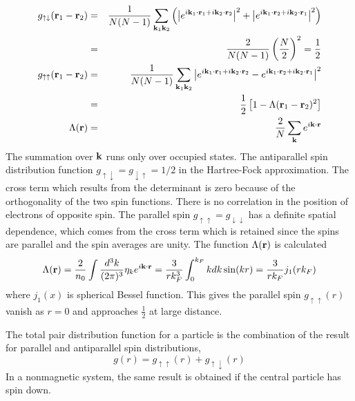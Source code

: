 \begin{eqnarray}
    g_{\uparrow\downarrow}(\mathbf{r}_1-\mathbf{r}_2) &=& \frac{1}{N(N-1)}   \sum_{\mathbf{k}_1 \mathbf{k}_2} \left( \abs{e^{i\mathbf{k}_1\cdot \mathbf{r}_1 + i \mathbf{k}_2 \cdot \mathbf{r}_2}}^2 + \abs{e^{i \mathbf{k}_1\cdot \mathbf{r}_2 + i \mathbf{k}_2 \cdot \mathbf{r}_1}}^2  \right) \nonumber \\
    &=& \frac{2}{N(N-1)} \left( \frac{N}{2} \right)^2 = \frac{1}{2}  \label{5.66} \\
    g_{\uparrow\uparrow}(\mathbf{r}_1-\mathbf{r}_2) &=& \frac{1}{N(N-1)}  \sum_{\mathbf{k}_1 \mathbf{k}_2} \abs{e^{i\mathbf{k}_1\cdot\mathbf{r}_1 +i\mathbf{k}_2\cdot\mathbf{r}_2} - e^{i\mathbf{k}_1\cdot\mathbf{r}_2+ i \mathbf{k}_2\cdot \mathbf{r}_1}}^2    \nonumber \\
    &=& \frac{1}{2} \left[ 1 - \Lambda(\mathbf{r}_1 -\mathbf{r}_2)^2 \right]  \label{5.67} \\
    \Lambda(\mathbf{r}) &=& \frac{2}{N} \sum_{\mathbf{k}} e^{i\mathbf{k}\cdot\mathbf{r}}  \label{5.68}
\end{eqnarray}
The summation over $\mathbf{k}$ runs only over occupied states.
The antiparallel spin distribution function $g_{\uparrow\downarrow}=g_{\downarrow\uparrow}= 1/2$ in the Hartree-Fock approximation.
The cross term which results from the determinant is zero because of the orthogonality of the two spin functions.
There is no correlation in the position of electrons of opposite spin.
The parallel spin $g_{\uparrow\uparrow}=g_{\downarrow\downarrow}$ has a definite spatial dependence, which comes from the cross term which is retained since the spins are parallel and the spin averages are unity.
The function $\Lambda(\mathbf{r})$ is calculated
\begin{equation}
    \Lambda(\mathbf{r}) = \frac{2}{n_0} \int \frac{d^3 k}{(2\pi)^3} \eta_k e^{i\mathbf{k}\cdot\mathbf{r}} = \frac{3}{rk_F^3} \int_0^{k_F} kdk \sin(kr) = \frac{3}{rk_F} j_1(rk_F)    \label{5.69}
\end{equation}
where $j_1(x)$ is spherical Bessel function.
This gives the parallel spin $g_{\uparrow\uparrow}(r)$ vanish as $r=0$ and approaches $\frac{1}{2}$ at large distance.

The total pair distribution function for a particle is the combination of the result for parallel and antiparallel spin distributions,
\begin{equation}
    g(r) = g_{\uparrow\uparrow}(r) + g_{\uparrow\downarrow}(r)  \label{5.70}
\end{equation}
In a nonmagnetic system, the same result is obtained if the central particle has spin down.

